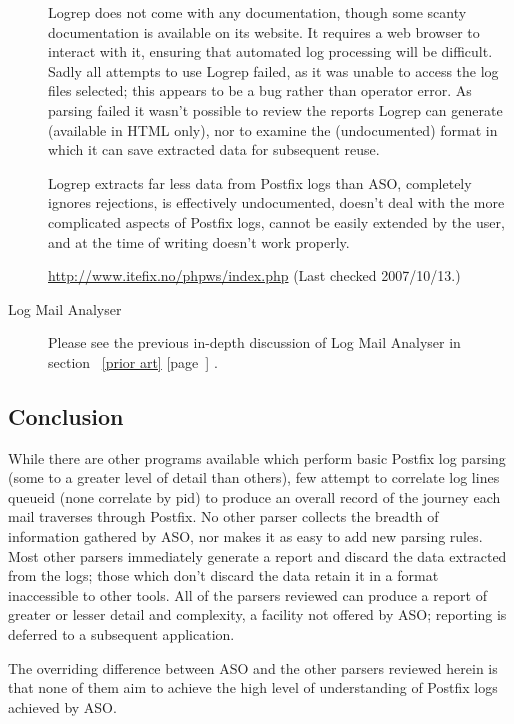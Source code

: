 \documentclass[a4paper,12pt,draft]{article}
\newcommand{\parsername}{ASO}
\newcommand{\refwithpage}[1]{%
    \empty{}\ref{#1} [page~\pageref{#1}]%
}
\begin{document}
\begin{description}
        Logrep does not come with any documentation, though some scanty
        documentation is available on its website.  It requires a web
        browser to interact with it, ensuring that automated log processing
        will be difficult.  Sadly all attempts to use Logrep failed, as it
        was unable to access the log files selected; this appears to be a
        bug rather than operator error.  As parsing failed it wasn't
        possible to review the reports Logrep can generate (available in
        HTML only), nor to examine the (undocumented) format in which it
        can save extracted data for subsequent reuse.

        Logrep extracts far less data from Postfix logs than \parsername{},
        completely ignores rejections, is effectively undocumented, doesn't
        deal with the more complicated aspects of Postfix logs, cannot be
        easily extended by the user, and at the time of writing doesn't
        work properly.

        \url{http://www.itefix.no/phpws/index.php} \newline (Last checked
        2007/10/13.)

    \item [Log Mail Analyser] Please see the previous in-depth discussion
        of Log Mail Analyser in section~\refwithpage{prior art}.

\end{description}

\subsection{Conclusion}

While there are other programs available which perform basic Postfix log
parsing (some to a greater level of detail than others), few
attempt to correlate log lines queueid (none correlate by pid) to produce
an overall record of the journey each mail traverses through Postfix.  No
other parser collects the breadth of information gathered by \parsername{},
nor makes it as easy to add new parsing rules.  Most other parsers
immediately generate a report and discard the data extracted from the logs;
those which don't discard the data retain it in a format inaccessible to
other tools.  All of the parsers reviewed can produce a report of greater
or lesser detail and complexity, a facility not offered by \parsername{};
reporting is deferred to a subsequent application.

The overriding difference between \parsername{} and the other parsers
reviewed herein is that none of them aim to achieve the high level of
understanding of Postfix logs achieved by \parsername{}.
\end{document}

